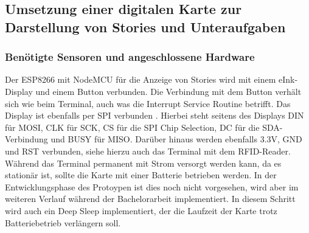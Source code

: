 \documentclass[12pt,titlepage]{scrartcl}
\begin{document}
		\subsection{Umsetzung einer digitalen Karte zur Darstellung von Stories und Unteraufgaben}
			\subsubsection{Benötigte Sensoren und angeschlossene Hardware}
			Der ESP8266 mit NodeMCU für die Anzeige von Stories wird mit einem eInk-Display und einem Button verbunden. Die Verbindung mit dem Button verhält sich wie beim Terminal, auch was die Interrupt Service Routine betrifft. Das Display ist ebenfalls per SPI verbunden \cite{wavesharespecs}. Hierbei steht seitens des Displays DIN für MOSI, CLK für SCK, CS für die SPI Chip Selection, DC für die SDA-Verbindung und BUSY für MISO. Darüber hinaus werden ebenfalls 3.3V, GND und RST verbunden, siehe hierzu auch das Terminal mit dem RFID-Reader. Während das Terminal permanent mit Strom versorgt werden kann, da es stationär ist, sollte die Karte mit einer Batterie betrieben werden. In der Entwicklungsphase des Protoypen ist dies noch nicht vorgesehen, wird aber im weiteren Verlauf während der Bachelorarbeit implementiert. In diesem Schritt wird auch ein Deep Sleep implementiert, der die Laufzeit der Karte trotz Batteriebetrieb verlängern soll.
\end{document}
